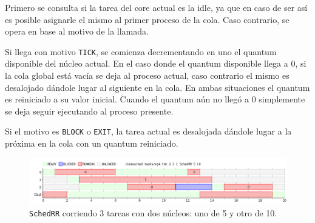 Primero se consulta si la tarea del core actual es la idle, ya que
en caso de ser así es posible asignarle el mismo al primer proceso de la cola. Caso
contrario, se opera en base al motivo de la llamada.

Si llega con motivo \texttt{TICK}, se comienza decrementando en uno el quantum disponible
del núcleo actual. En el caso donde el quantum disponible llega a 0, si la cola
global está vacía se deja al proceso actual, caso contrario el mismo es
desalojado dándole lugar al siguiente en la cola. En ambas situaciones el
quantum es reiniciado a su valor inicial. Cuando el quantum aún no llegó a 0
simplemente se deja seguir ejecutando al proceso presente.

Si el motivo es \texttt{BLOCK} o \texttt{EXIT}, la tarea actual es desalojada
dándole lugar a la próxima en la cola con un quantum reiniciado.

\begin{figure}[H]
	\begin{center}
		\includegraphics[width=1\columnwidth]{imagenes/ej4.png}
		\caption{\texttt{SchedRR} corriendo 3 tareas con dos núcleos: uno de 5 y
		otro de 10.}
	\end{center}
\end{figure}
